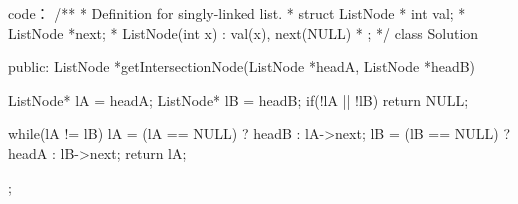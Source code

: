 code：
/**
 * Definition for singly-linked list.
 * struct ListNode {
 *     int val;
 *     ListNode *next;
 *     ListNode(int x) : val(x), next(NULL) {}
 * };
 */
class Solution {
public:
    ListNode *getIntersectionNode(ListNode *headA, ListNode *headB) {
        ListNode* lA = headA;
        ListNode* lB = headB;
        if(!lA || !lB) return NULL;
        
        while(lA != lB)
        {
            lA = (lA == NULL) ? headB : lA->next;
            lB = (lB == NULL) ? headA : lB->next;
        }
        return lA;
    }
};